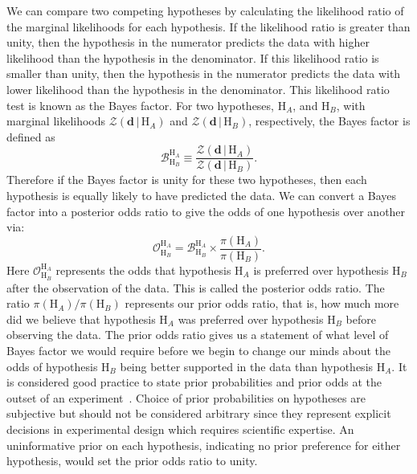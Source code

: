 We can compare two competing hypotheses by calculating the likelihood ratio of the marginal likelihoods for each hypothesis. If the likelihood ratio is greater than unity, then the hypothesis in the numerator predicts the data with higher likelihood than the hypothesis in the denominator. If this likelihood ratio is smaller than unity, then the hypothesis in the numerator predicts the data with lower likelihood than the hypothesis in the denominator. This likelihood ratio test is known as the Bayes factor. For two hypotheses, $\mathrm{H}_A$, and $\mathrm{H}_B$, with marginal likelihoods $\mathcal{Z}(\mathbf{d} \, | \, \mathrm{H}_A)$ and $\mathcal{Z}(\mathbf{d} \, | \, \mathrm{H}_B)$, respectively, the Bayes factor is defined as
\begin{equation}
    \mathcal{B}^{\mathrm{H}_A}_{\mathrm{H}_B} \equiv \frac{\mathcal{Z}(\mathbf{d} \, | \, \mathrm{H}_A)}{\mathcal{Z}(\mathbf{d} \, |  \, \mathrm{H}_B)}.
\end{equation}
Therefore if the Bayes factor is unity for these two hypotheses, then each hypothesis is equally likely to have predicted the data. We can convert a Bayes factor into a posterior odds ratio to give the odds of one hypothesis over another via:
\begin{equation}\label{eqn:odds_ratio}
    \mathcal{O}^{\mathrm{H}_A}_{\mathrm{H}_B} = \mathcal{B}^{\mathrm{H}_A}_{\mathrm{H}_B} \times \frac{\pi(\mathrm{H}_A)}{\pi(\mathrm{H}_B)}.
\end{equation}
Here $\mathcal{O}^{\mathrm{H}_A}_{\mathrm{H}_B}$ represents the odds that hypothesis $\mathrm{H}_A$ is preferred over hypothesis $\mathrm{H}_B$ after the observation of the data. This is called the posterior odds ratio. The ratio $\pi(\mathrm{H}_A) / \pi(\mathrm{H}_B)$ represents our prior odds ratio, that is, how much more did we believe that hypothesis $\mathrm{H}_A$  was preferred over hypothesis $\mathrm{H}_B$  before observing the data. The prior odds ratio gives us a statement of what level of Bayes factor we would require before we begin to change our minds about the odds of hypothesis $\mathrm{H}_B$ being better supported in the data than hypothesis $\mathrm{H}_A$. It is considered good practice to state prior probabilities and prior odds at the outset of an experiment~\cite{hobson2010bayesian}. Choice of prior probabilities on hypotheses are subjective but should not be considered arbitrary since they represent explicit decisions in experimental design which requires scientific expertise. An uninformative prior on each hypothesis, indicating no prior preference for either hypothesis, would set the prior odds ratio to unity.

